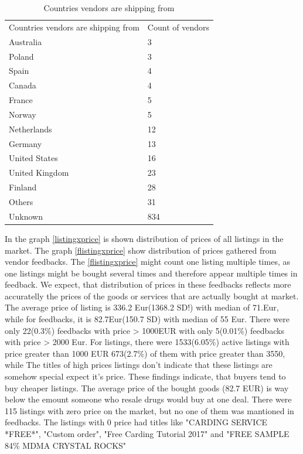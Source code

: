 \documentclass[
  digital, %
  table,   %
  lof,     %
  lot,     %
  oneside
]{fithesis3}
\begin{document}
\begin{table}
    \caption{Countries vendors are shipping from}
    \label{shipcount}
    \begin{tabular}{|l|l|}
    Countries vendors are shipping from  & Count of vendors\\
        Australia                                    & 3   \\ 
        Poland                                       & 3   \\ 
        Spain                                        & 4   \\ 
        Canada                                       & 4   \\ 
        France                                       & 5   \\ 
        Norway                                       & 5   \\ 
        Netherlands                                  & 12  \\ 
        Germany                                      & 13  \\ 
        United States                                & 16  \\ 
        United Kingdom                               & 23  \\ 
        Finland                                      & 28  \\ 
        Others                                       & 31   \\
        Unknown                                      & 834  
    \end{tabular}
\end{table}


In the graph \ref{listingxprice} is shown distribution of prices of all listings in
 the market. 
 The graph \ref{flistingxprice} show distribution of prices gathered
 from vendor feedbacks. The \ref{flistingxprice} might count one listing
 multiple times, as one listings might be bought several times
 and therefore appear multiple times in feedback. We expect, that distribution
 of prices in these feedbacks reflects more accuratelly the prices of the goods or services
 that are actually bought at market.
 The average price of listing is 336.2 Eur(1368.2 SD!) with median of 71.Eur,
 while for feedbacks, it is 82.7Eur(150.7 SD) with median of 55 Eur.
  There were only 22(0.3\%) feedbacks with price > 1000EUR
 with only 5(0.01\%) feedbacks with price > 2000 Eur.
  For listings, there were 1533(6.05\%) active listings
 with price greater than 1000 EUR
 673(2.7\%) of them with price greater than 3550, while
 The titles of high prices listings don't indicate that 
 these listings are somehow special expect it's price.
 These findings indicate, that buyers tend to buy
 cheaper listings. The average price of the bought goods (82.7 EUR)
 is way below the emount someone who resale drugs would buy at one deal.
 There were 115 listings with zero price on the market,
 but no one of them was mantioned in feedbacks.
 The listings with 0 price had titles like "CARDING SERVICE *FREE*",
 "Custom order", "Free Carding Tutorial 2017" and "FREE SAMPLE 84\% MDMA CRYSTAL ROCKS"
\end{document}
